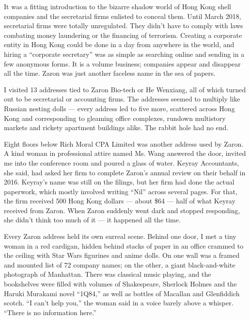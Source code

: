 It was a fitting introduction to the bizarre shadow world of Hong Kong
shell companies and the secretarial firms enlisted to conceal them.
Until March 2018, secretarial firms were totally unregulated. They
didn't have to comply with laws combating money laundering or the
financing of terrorism. Creating a corporate entity in Hong Kong could
be done in a day from anywhere in the world, and hiring a ``corporate
secretary'' was as simple as searching online and sending in a few
anonymous forms. It is a volume business; companies appear and disappear
all the time. Zaron was just another faceless name in the sea of papers.

I visited 13 addresses tied to Zaron Bio-tech or He Wenxiang, all of
which turned out to be secretarial or accounting firms. The addresses
seemed to multiply like Russian nesting dolls --- every address led to
five more, scattered across Hong Kong and corresponding to gleaming
office complexes, rundown multistory markets and rickety apartment
buildings alike. The rabbit hole had no end.

Eight floors below Rich Moral CPA Limited was another address used by
Zaron. A kind woman in professional attire named Ms. Wang answered the
door, invited me into the conference room and poured a glass of water.
Keyray Accountants, she said, had asked her firm to complete Zaron's
annual review on their behalf in 2016. Keyray's name was still on the
filings, but her firm had done the actual paperwork, which mostly
involved writing ``Nil'' across several pages. For that, the firm
received 500 Hong Kong dollars --- about \$64 --- half of what Keyray
received from Zaron. When Zaron suddenly went dark and stopped
responding, she didn't think too much of it --- it happened all the
time.

Every Zaron address held its own surreal scene. Behind one door, I met a
tiny woman in a red cardigan, hidden behind stacks of paper in an office
crammed to the ceiling with Star Wars figurines and anime dolls. On one
wall was a framed and mounted list of 72 company names; on the other, a
giant black-and-white photograph of Manhattan. There was classical music
playing, and the bookshelves were filled with volumes of Shakespeare,
Sherlock Holmes and the Haruki Murakami novel ``1Q84,'' as well as
bottles of Macallan and Glenfiddich scotch. ``I can't help you,'' the
woman said in a voice barely above a whisper. ``There is no information
here.''


